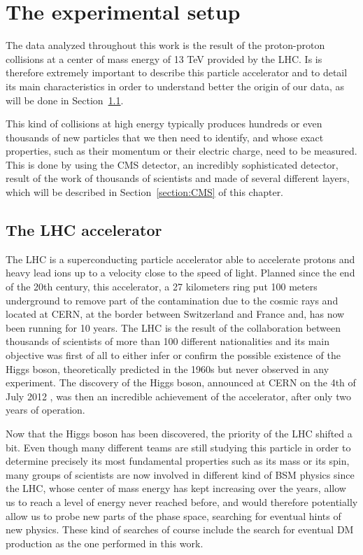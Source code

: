 \documentclass[a4paper, 10pt, openright]{report}
\begin{document}
\chapter{The experimental setup} \label{chapter:Device}

The data analyzed throughout this work is the result of the proton-proton collisions at a center of mass energy of 13 TeV provided by the \acf{LHC}. Is is therefore extremely important to describe this particle accelerator and to detail its main characteristics in order to understand better the origin of our data, as will be done in Section~\ref{section:LHC}. 

This kind of collisions at high energy typically produces hundreds or even thousands of new particles that we then need to identify, and whose exact properties, such as their momentum or their electric charge, need to be measured. This is done by using the \acf{CMS} detector, an incredibly sophisticated detector, result of the work of thousands of scientists and made of several different layers, which will be described in Section~\ref{section:CMS} of this chapter.

\section{The \ac{LHC} accelerator} \label{section:LHC}

The \acf{LHC} is a superconducting particle accelerator able to accelerate protons and heavy lead ions up to a velocity close to the speed of light. Planned since the end of the 20th century, this accelerator, a 27 kilometers ring put 100 meters underground to remove part of the contamination due to the cosmic rays and located at \ac{CERN}, at the border between Switzerland and France and, has now been running for 10 years. The \ac{LHC} is the result of the collaboration between thousands of scientists of more than 100 different nationalities and its main objective was first of all to either infer or confirm the possible existence of the Higgs boson, theoretically predicted in the 1960s \cite{HiggsPostulate1, HiggsPostulate2} but never observed in any experiment. The discovery of the Higgs boson, announced at \ac{CERN} on the 4th of July 2012 \cite{HiggsDiscovery1, HiggsDiscovery2}, was then an incredible achievement of the accelerator, after only two years of operation.

Now that the Higgs boson has been discovered, the priority of the \ac{LHC} shifted a bit. Even though many different teams are still studying this particle in order to determine precisely its most fundamental properties such as its mass or its spin, many groups of scientists are now involved in different kind of \ac{BSM} physics since the \ac{LHC}, whose center of mass energy has kept increasing over the years, allow us to reach a level of energy never reached before, and would therefore potentially allow us to probe new parts of the phase space, searching for eventual hints of new physics. These kind of searches of course include the search for eventual \ac{DM} production as the one performed in this work. 
\end{document}
